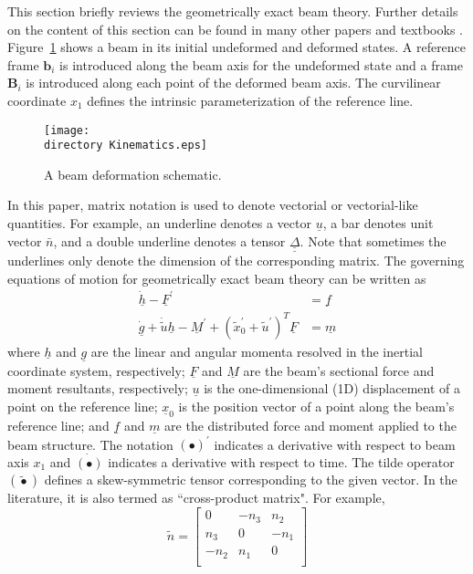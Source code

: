 \documentclass{aiaa-tc}
\def\directory{EPSF/}
\renewcommand{\vec}[1]{\underline{#1}}
\renewcommand{\skew}[1]{\widetilde{#1}}
\begin{document}
This section briefly reviews the geometrically exact beam theory. Further details on the content of this section can be found in many other papers and textbooks \cite{HodgesBeamBook,Bauchau:2010,YuGEBT}.
Figure~\ref{Kinematics} shows a beam in its initial undeformed
and deformed states. A reference frame $\mathbf{b}_i$ is introduced along the
beam axis for the undeformed state and a frame $\mathbf{B}_i$ is introduced
along each point of the deformed beam axis. The curvilinear coordinate $x_1$ defines the intrinsic parameterization of the reference line.
\begin{figure}
\centering
\texttt{[image: \\directory Kinematics.eps]}
\caption{A beam deformation schematic.} \label{Kinematics}
\end{figure}
In this paper, matrix notation is used to denote vectorial or vectorial-like quantities. For example, an underline denotes a vector $\underline{u}$, a bar denotes unit vector $\bar{n}$, and a double underline denotes a tensor $\underline{\underline{\Delta}}$. Note that sometimes the underlines only denote the dimension of the corresponding matrix. The governing equations of motion for geometrically exact beam theory can be written as \cite{Bauchau:2010}
\begin{align}
	\label{GovernGEBT-1}
	\dot{\underline{h}} - \underline{F}^\prime &= \underline{f} \\
	\label{GovernGEBT-2}
	\dot{\underline{g}} + \dot{\tilde{u}} \underline{h} - \underline{M}^\prime + (\tilde{x}_0^\prime + \tilde{u}^\prime)^T \underline{F} &= \underline{m}
\end{align}
where $\vec{h}$ and $\vec{g}$ are the linear and angular momenta resolved in the inertial coordinate system, respectively; $\vec{F}$ and $\vec{M}$ are the beam's sectional force and moment resultants, respectively; $\vec{u}$ is the one-dimensional (1D) displacement of a point on the reference line; $\vec{x}_0$ is the position vector of a point along the beam's reference line;  and $\vec{f}$ and $\vec{m}$ are the distributed force and moment applied to the beam structure.  The notation $(\bullet)^\prime$ indicates a derivative with respect to beam axis $x_1$ and $\dot{(\bullet)}$ indicates a derivative with respect to time. The tilde operator $(\skew{\bullet})$ defines a skew-symmetric tensor corresponding to the given vector. In the literature, it is also termed as ``cross-product matrix". For example,
\[
	\skew{n} = 
	     		\begin{bmatrix}
			0 & -n_3 & n_2 \\
			n_3 & 0 & -n_1 \\
			-n_2 & n_1 & 0\\
			\end{bmatrix}	
\]
\end{document}
